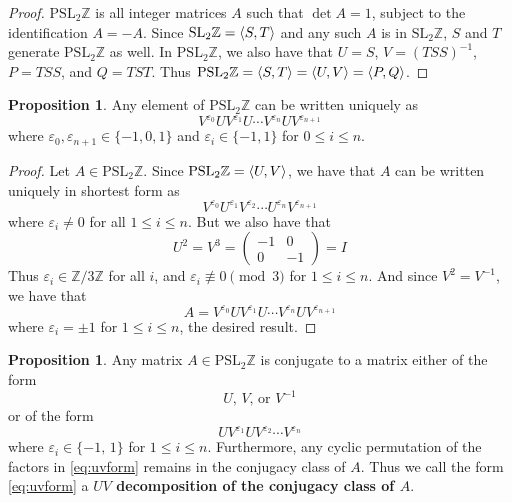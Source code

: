 \documentclass[12pt,twoside]{reedthesis}
\theoremstyle{definition}
\newtheorem{prop}[thm]{Proposition}
\newcommand{\Z}{\mathbb{Z}}
\newcommand{\SLZ}{\mathrm{SL}_2{\Z}}
\newcommand{\PSLZ}{\mathrm{PSL}_2{\Z}}
\newcommand{\defnphrase}[1]{\textbf{#1}}
\DeclarePairedDelimiter\ang{\langle}{\rangle}
\begin{document}
\begin{proof}
  $\PSLZ$ is all integer matrices $A$ such that $\det A = 1$, subject to the identification $A = -A$.
  Since $\SLZ = \ang{S,T}$ and any such $A$ is in $\SLZ$, $S$ and $T$ generate $\PSLZ$ as well.
  In $\PSLZ$, we also have that $U = S$, $V = (TSS)^{-1}$, $P = TSS$, and $Q = TST$.
  Thus $\PSLZ = \ang{S,T} = \ang{U,V} = \ang{P,Q}$.
\end{proof}

\begin{prop}\label{prop:reducedform}
  Any element of $\PSLZ$ can be written uniquely as
  \begin{equation}
    V^{\varepsilon_0} U V^{\varepsilon_1} U \cdots V^{\varepsilon_{n}} U V^{\varepsilon_{n+1}}
  \end{equation}
  where $\varepsilon_0, \varepsilon_{n+1} \in \{-1,0,1\}$ and $\varepsilon_i \in \{-1,1\}$ for $0 \leq i \leq n$.
\end{prop}

\begin{proof}
  Let $A \in \PSLZ$.
  Since $\PSLZ = \ang{U,V}$, we have that $A$ can be written uniquely in shortest form as
  \begin{equation*}
    V^{\varepsilon_0} U^{\varepsilon_1} V^{\varepsilon_2} \cdots U^{\varepsilon_{n}} V^{\varepsilon_{n+1}}
  \end{equation*}
  where $\varepsilon_i \neq 0$ for all $ 1 \leq i \leq n$.
  But we also have that
  \begin{equation*}
    U^2 = V^3 = \begin{pmatrix}
      -1 & 0 \\
      0 & -1
    \end{pmatrix}
    = I
  \end{equation*}
  Thus $\varepsilon_i \in \Z / 3 \Z$ for all $i$, and $\varepsilon_i \not\equiv 0 \pmod 3$ for $1 \leq i \leq n$.
  And since $V^2 = V^{-1}$, we have that
  \begin{equation*}
    A = V^{\varepsilon_0} U V^{\varepsilon_1} U \cdots V^{\varepsilon_n} U V^{\varepsilon_{n+1}}
  \end{equation*}
  where $\varepsilon_i = \pm 1$ for $1 \leq i \leq n$, the desired result.
\end{proof}

\begin{prop}
  Any matrix $A \in \PSLZ$ is conjugate to a matrix either of the form
  \begin{equation*}
    \text{$U$, $V$, or $V^{-1}$}
  \end{equation*}
  or of the form
  \begin{equation}\label{eq:uvform}
    U V^{\varepsilon_1} U V^{\varepsilon_2} \cdots V^{\varepsilon_{n}}
  \end{equation}
  where $\varepsilon_i \in \{-1,\, 1\}$ for $1 \leq i \leq n$.
  Furthermore, any cyclic permutation of the factors in \eqref{eq:uvform} remains in the conjugacy class of $A$.
  Thus we call the form \eqref{eq:uvform} a \defnphrase{$UV$ decomposition of the conjugacy class of $A$}.
\end{prop}
\end{document}
